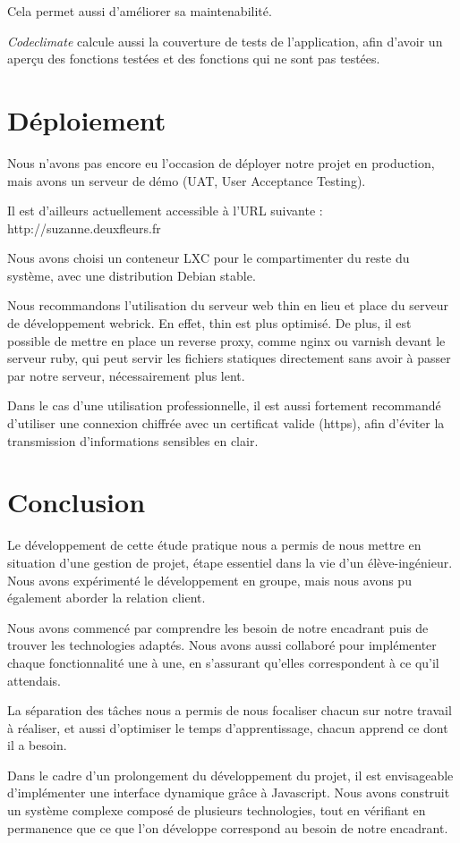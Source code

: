 \documentclass[a4paper,11pt]{article}
\begin{document}
Cela permet aussi d'améliorer sa maintenabilité.

\textit{Codeclimate} calcule aussi la couverture de tests de l'application, afin d'avoir un aperçu des fonctions testées et des fonctions qui ne sont pas testées.

\section{Déploiement}

Nous n'avons pas encore eu l'occasion de déployer notre projet en production, mais avons un serveur de démo (UAT, User Acceptance Testing).

Il est d'ailleurs actuellement accessible à l'URL suivante : http://suzanne.deuxfleurs.fr

Nous avons choisi un conteneur LXC pour le compartimenter du reste du système, avec une distribution Debian stable.

Nous recommandons l'utilisation du serveur web thin en lieu et place du serveur de développement webrick. En effet, thin est plus optimisé. De plus, il est possible de mettre en place un reverse proxy, comme nginx ou varnish devant le serveur ruby, qui peut servir les fichiers statiques directement sans avoir à passer par notre serveur, nécessairement plus lent.

Dans le cas d'une utilisation professionnelle, il est aussi fortement recommandé d'utiliser une connexion chiffrée avec un certificat valide (https), afin d'éviter la transmission d'informations sensibles en clair. 

\section{Conclusion} 
 
Le développement de cette étude pratique nous a permis de nous mettre en situation d’une gestion de projet, étape essentiel dans la vie d’un élève-ingénieur. Nous avons expérimenté le développement en groupe, mais nous avons pu également aborder la relation client.

Nous avons commencé par comprendre les besoin de notre encadrant puis  de trouver les technologies adaptés. Nous avons aussi collaboré pour implémenter chaque fonctionnalité une à une, en s’assurant qu’elles correspondent à ce qu’il attendais.

La séparation des tâches nous a permis de nous focaliser chacun sur notre travail à réaliser, et aussi d’optimiser le temps d’apprentissage, chacun apprend ce dont il a besoin.

Dans le cadre d’un prolongement du développement du projet, il est envisageable d’implémenter une interface dynamique grâce à Javascript.
Nous avons construit un système complexe composé de plusieurs technologies, tout en vérifiant en permanence que ce que l’on développe correspond au besoin de notre encadrant. 




\end{document}
